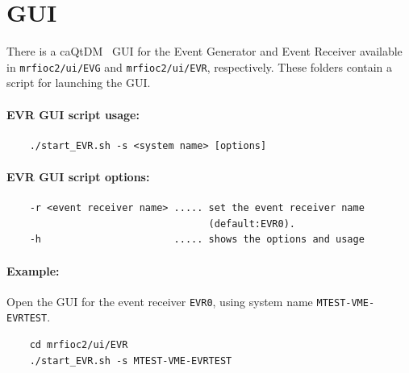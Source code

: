 \documentclass[12pt,a4paper]{article}
\let\stdsection\section
\renewcommand\section{\newpage\stdsection}
\begin{document}


\section{GUI}\label{sec:GUI}
There is a caQtDM~\cite{caqtdm} GUI for the Event Generator and Event Receiver available in \texttt{mrfioc2/ui/EVG} and \texttt{mrfioc2/ui/EVR}, respectively. These folders contain a script for launching the GUI.

\paragraph{EVR GUI script usage:}
\begin{verbatim}
	./start_EVR.sh -s <system name> [options]
\end{verbatim}


\paragraph{EVR GUI script options:}
\begin{verbatim}
	-r <event receiver name> ..... set the event receiver name
	                               (default:EVR0).
	-h                       ..... shows the options and usage
\end{verbatim}


\paragraph{Example:} Open the GUI for the event receiver \texttt{EVR0}, \newline using system name \texttt{MTEST-VME-EVRTEST}.
\begin{verbatim}
	cd mrfioc2/ui/EVR
	./start_EVR.sh -s MTEST-VME-EVRTEST
\end{verbatim}




\end{document}
